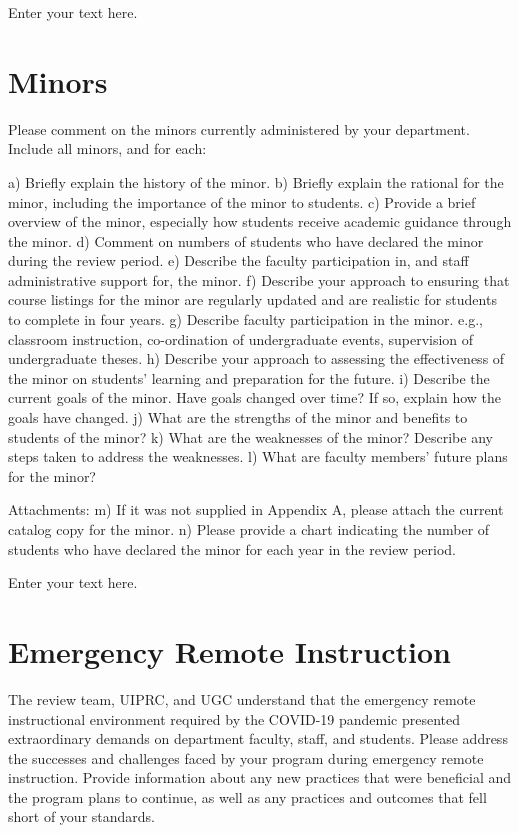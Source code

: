 \documentclass[12pt]{article}
\begin{document}
Enter your text here.

	
\section{Minors}
Please comment on the minors currently administered by your department. Include all minors, and for each:

    a) Briefly explain the history of the minor.
    b) Briefly explain the rational for the minor, including the importance of the minor to students.
    c) Provide a brief overview of the minor, especially how students receive academic
guidance through the minor.
    d) Comment on numbers of students who have declared the minor during the review period.
    e) Describe the faculty participation in, and staff administrative support for, the minor.
    f) Describe your approach to ensuring that course listings for the minor are regularly updated and are realistic for students to complete in four years.
    g) Describe faculty participation in the minor. e.g., classroom instruction, co-ordination of
undergraduate events, supervision of undergraduate theses.
    h) Describe your approach to assessing the effectiveness of the minor on students’ learning and preparation for the future.
    i) Describe the current goals of the minor. Have goals changed over time? If so, explain
how the goals have changed.
    j) What are the strengths of the minor and benefits to students of the minor?
    k) What are the weaknesses of the minor? Describe any steps taken to address the
weaknesses.
    l) What are faculty members’ future plans for the minor?

Attachments:
    m) If it was not supplied in Appendix A, please attach the current catalog copy for the minor.
    n) Please provide a chart indicating the number of students who have declared the minor for each year in the review period.

Enter your text here.


\section{Emergency Remote Instruction}
The review team, UIPRC, and UGC understand that the emergency remote instructional environment required by the COVID-19 pandemic presented extraordinary demands on department faculty, staff, and students. Please address the successes and challenges faced by your program during emergency remote instruction. Provide information about any new practices that were beneficial and the program plans to continue, as well as any practices and outcomes that fell short of your standards.
\end{document}
